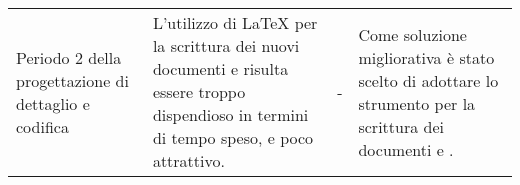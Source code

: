 {\begin{longtable}{ C{3cm} C{4cm} C{3cm} C{4cm}}
	Periodo 2 della progettazione di dettaglio e codifica & L'utilizzo di \LaTeX{} per la scrittura dei nuovi documenti \MM e \MU risulta essere troppo dispendioso in termini di tempo speso, e poco attrattivo. & - & Come soluzione migliorativa è stato scelto di adottare lo strumento  per la scrittura dei documenti \MM e \MU.\\
	
	
\end{longtable}
}






